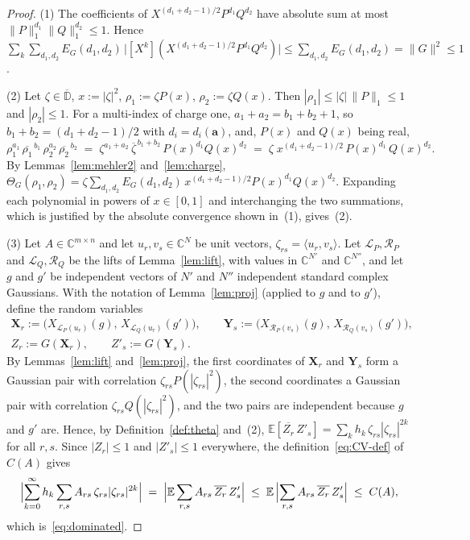 \documentclass[11pt,reqno]{amsart}
\theoremstyle{definition}
\numberwithin{equation}{section}
\newcommand{\C}{\mathbb{C}}
\newcommand{\D}{\mathbb{D}}
\newcommand{\E}{\mathbb{E}}
\newcommand{\lone}[1]{\|#1\|_1}
\begin{document}
\begin{proof}
(1) The coefficients of $X^{(d_1+d_2-1)/2}P^{d_1}Q^{d_2}$ have absolute sum at most $\lone{P}^{d_1}\lone{Q}^{d_2}\le1$. Hence $\sum_k\sum_{d_1,d_2}E_G(d_1,d_2)\,\bigl|[X^k](X^{(d_1+d_2-1)/2}P^{d_1}Q^{d_2})\bigr|\le\sum_{d_1,d_2}E_G(d_1,d_2)=\|G\|^2\le1$.

(2) Let $\zeta\in\overline{\D}$, $x:=|\zeta|^2$, $\rho_1:=\zeta P(x)$, $\rho_2:=\zeta Q(x)$. Then $|\rho_1|\le|\zeta|\,\lone{P}\le1$ and $|\rho_2|\le1$. For a multi-index of charge one, $a_1+a_2=b_1+b_2+1$, so $b_1+b_2=(d_1+d_2-1)/2$ with $d_i=d_i(\mathbf{a})$, and, $P(x)$ and $Q(x)$ being real,
\[
  \rho_1^{a_1}\,\overline{\rho_1}^{\,b_1}\,\rho_2^{a_2}\,\overline{\rho_2}^{\,b_2}
  \;=\; \zeta^{a_1+a_2}\,\overline{\zeta}^{\,b_1+b_2}\,P(x)^{d_1}Q(x)^{d_2}
  \;=\; \zeta\; x^{(d_1+d_2-1)/2}\, P(x)^{d_1}\, Q(x)^{d_2}.
\]
By Lemmas~\ref{lem:mehler2} and~\ref{lem:charge}, $\Theta_G(\rho_1,\rho_2)=\zeta\sum_{d_1,d_2}E_G(d_1,d_2)\,x^{(d_1+d_2-1)/2}P(x)^{d_1}Q(x)^{d_2}$. Expanding each polynomial in powers of $x\in[0,1]$ and interchanging the two summations, which is justified by the absolute convergence shown in~(1), gives~(2).

(3) Let $A\in\C^{m\times n}$ and let $u_r,v_s\in\C^N$ be unit vectors, $\zeta_{rs}=\langle u_r,v_s\rangle$. Let $\mathcal{L}_P,\mathcal{R}_P$ and $\mathcal{L}_Q,\mathcal{R}_Q$ be the lifts of Lemma~\ref{lem:lift}, with values in $\C^{N'}$ and $\C^{N''}$, and let $g$ and $g'$ be independent vectors of $N'$ and $N''$ independent standard complex Gaussians. With the notation of Lemma~\ref{lem:proj} (applied to $g$ and to $g'$), define the random variables
\begin{gather*}
  \mathbf{X}_r:=\bigl(X_{\mathcal{L}_P(u_r)}(g),\,X_{\mathcal{L}_Q(u_r)}(g')\bigr),\qquad
  \mathbf{Y}_s:=\bigl(X_{\mathcal{R}_P(v_s)}(g),\,X_{\mathcal{R}_Q(v_s)}(g')\bigr),\\
  Z_r:=G(\mathbf{X}_r),\qquad Z'_s:=G(\mathbf{Y}_s).
\end{gather*}
By Lemmas~\ref{lem:lift} and~\ref{lem:proj}, the first coordinates of $\mathbf{X}_r$ and $\mathbf{Y}_s$ form a Gaussian pair with correlation $\zeta_{rs}P(|\zeta_{rs}|^2)$, the second coordinates a Gaussian pair with correlation $\zeta_{rs}Q(|\zeta_{rs}|^2)$, and the two pairs are independent because $g$ and $g'$ are. Hence, by Definition~\ref{def:theta} and~(2), $\E[\overline{Z_r}\,Z'_s]=\sum_kh_k\,\zeta_{rs}|\zeta_{rs}|^{2k}$ for all $r,s$. Since $|Z_r|\le1$ and $|Z'_s|\le1$ everywhere, the definition~\eqref{eq:CV-def} of $C(A)$ gives
\[
  \Bigl|\sum_{k=0}^\infty h_k\sum_{r,s} A_{rs}\,\zeta_{rs}|\zeta_{rs}|^{2k}\Bigr|
  \;=\;\Bigl|\E\sum_{r,s} A_{rs} \, \overline{Z_r}\, Z'_s\Bigr|
  \;\le\; \E\,\Bigl|\sum_{r,s} A_{rs} \, \overline{Z_r}\, Z'_s\Bigr|
  \;\le\; C(A),
\]
which is~\eqref{eq:dominated}.
\end{proof}
\end{document}
